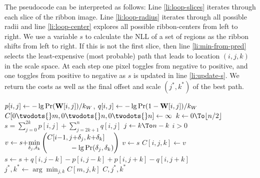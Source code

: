 The pseudocode can be interpreted as follows: Line \ref{li:loop-slices} iterates through each slice of the ribbon image. Line \ref{li:loop-radius} iterates through all possible radii and line \ref{li:loop-center} explores all possible ribbon-centers from left to right. We use a variable $s$ to calculate the \ac{NLL} of a set of regions as the ribbon shifts from left to right. If this is not the first slice, then line \ref{li:min-from-pred} selects the least-expensive (most probable) path that leads to location $(i, j, k)$ in the scale space.  At each step one pixel toggles from negative to positive, and one toggles from positive to negative as $s$ is updated in line \ref{li:update-s}.  We return the costs as well as the final offset and scale $(j^*, k^*)$ of the best path. 


\begin{codebox}
 \label{alg:segmet-ribbin}
\li $p[i,j]\gets -\lg \Pr(\mathbf{W}{}[i,j])/k_W{}$, 
          \hspace{2ex} $q[i,j] \gets -\lg \Pr(1-\mathbf{W}{}[i,j])/k_W{}$
\li $C{[0\twodots{}m, 0\twodots{}n, 0\twodots{}n]} \gets \infty$
\li {} \Do                                                \label{li:loop-slices}
\li     \For $k \gets 0 \To \lfloor n/2 \rfloor $ \Do                          \label{li:loop-radius}
\li         $s = \displaystyle{\sum_{j=0}^{2k} p[i,j] +\sum_{j=2k+1}^n  q[i, j] }$
\li         \For $j \gets k \To n-k$ \Do  \label{li:loop-center}
\li              \If $i > 0$  \Do                                              \label{li:if-has-pred}
\li              $v \gets s {+}\displaystyle{\min_{\delta_j, \delta_k}\left(  
                              \begin{aligned}
                              C[i{-}1,j{+}\delta_j,k{+}\delta_k] \hspace{3ex}\\
                              \hfill{}-\lg \Pr(\delta_j, \delta_k)
                              \end{aligned}
                            \right)}$  
                               \label{li:min-from-pred}
\li              \Else $v\gets s$
                 \End
\li              $C{[i, j, k]} \gets v$                                       \label{li:dp-store}
\li              $s \gets s{+}q[i,j{-}k]{-}p[i, j{-}k]{+}p[i, j{+}k]{-}q[i,j{+}k]$ \label{li:update-s}
           \End
       \End
    \End
\li $j^*, k^* \gets \displaystyle{\arg\min_{j,k} C{[m, j, k]}}$
\li \Return $C, j^*, k^*$
\end{codebox}

